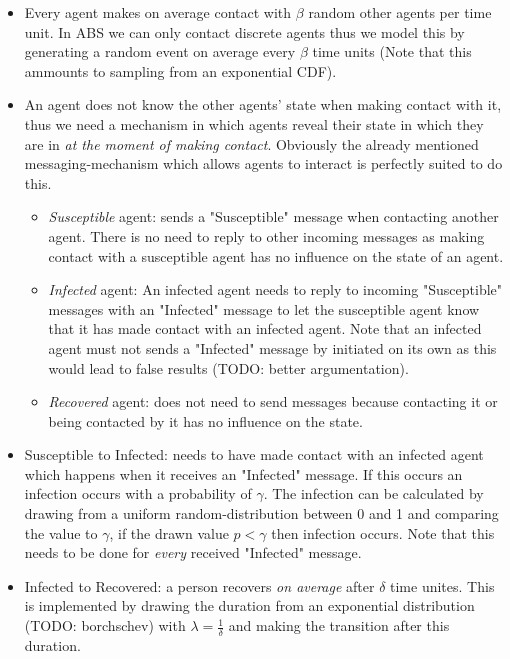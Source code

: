 \begin{itemize}
	\item Every agent makes on average contact with $\beta$ random other agents per time unit. In ABS we can only contact discrete agents thus we model this by generating a random event on average every $\beta$ time units (Note that this ammounts to sampling from an exponential CDF).
	
	\item An agent does not know the other agents' state when making contact with it, thus we need a mechanism in which agents reveal their state in which they are in \textit{at the moment of making contact}. Obviously the already mentioned messaging-mechanism which allows agents to interact is perfectly suited to do this.
	\begin{itemize}
		\item \textit{Susceptible} agent: sends a "Susceptible" message when contacting another agent. There is no need to reply to other incoming messages as making contact with a susceptible agent has no influence on the state of an agent.
		\item \textit{Infected} agent: An infected agent needs to reply to incoming "Susceptible" messages with an "Infected" message to let the susceptible agent know that it has made contact with an infected agent. Note that an infected agent must not sends a "Infected" message by initiated on its own as this would lead to false results (TODO: better argumentation).
		\item \textit{Recovered} agent: does not need to send messages because contacting it or being contacted by it has no influence on the state.
	\end{itemize}
	
	\item Susceptible to Infected: needs to have made contact with an infected agent which happens when it receives an "Infected" message. If this occurs an infection occurs with a probability of $\gamma$. The infection can be calculated by drawing from a uniform random-distribution between 0 and 1 and comparing the value to $\gamma$, if the drawn value $p < \gamma$ then infection occurs. Note that this needs to be done for \textit{every} received "Infected" message.
	
	\item Infected to Recovered: a person recovers \textit{on average} after $\delta$ time unites. This is implemented by drawing the duration from an exponential distribution (TODO: borchschev) with $\lambda = \frac{1}{\delta}$ and making the transition after this duration.
\end{itemize}

